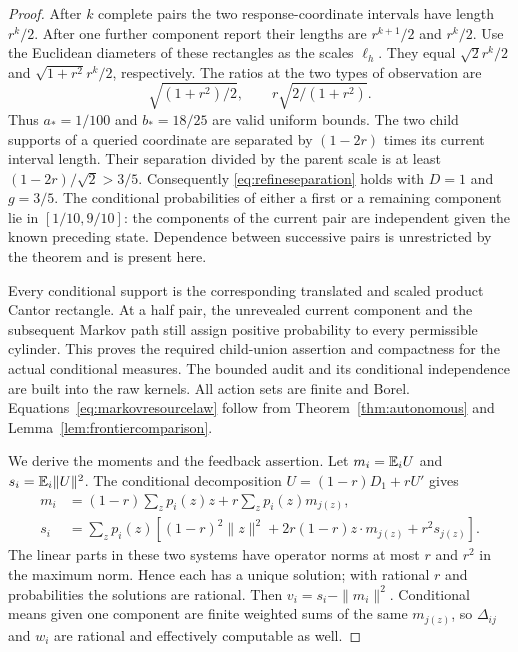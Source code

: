 \begin{proof}
After $k$ complete pairs the two response-coordinate intervals have length $r^k/2$. After one further component report their lengths are $r^{k+1}/2$ and $r^k/2$. Use the Euclidean diameters of these rectangles as the scales $\ell_h$. They equal $\sqrt2r^k/2$ and $\sqrt{1+r^2}r^k/2$, respectively. The ratios at the two types of observation are
\[
 \sqrt{(1+r^2)/2},\qquad r\sqrt{2/(1+r^2)}.
\]
Thus $a_*=1/100$ and $b_*=18/25$ are valid uniform bounds. The two child supports of a queried coordinate are separated by $(1-2r)$ times its current interval length. Their separation divided by the parent scale is at least $(1-2r)/\sqrt2>3/5$. Consequently \eqref{eq:refineseparation} holds with $D=1$ and $g=3/5$. The conditional probabilities of either a first or a remaining component lie in $[1/10,9/10]$: the components of the current pair are independent given the known preceding state. Dependence between successive pairs is unrestricted by the theorem and is present here.

Every conditional support is the corresponding translated and scaled product Cantor rectangle. At a half pair, the unrevealed current component and the subsequent Markov path still assign positive probability to every permissible cylinder. This proves the required child-union assertion and compactness for the actual conditional measures. The bounded audit and its conditional independence are built into the raw kernels. All action sets are finite and Borel. Equations~\eqref{eq:markovresourcelaw} follow from Theorem~\ref{thm:autonomous} and Lemma~\ref{lem:frontiercomparison}.

We derive the moments and the feedback assertion. Let $m_i=\mathbb E_iU$ and $s_i=\mathbb E_i\|U\|^2$. The conditional decomposition $U=(1-r)D_1+rU'$ gives
\begin{align}
 m_i&=(1-r)\sum_zp_i(z)z+r\sum_zp_i(z)m_{j(z)},\label{eq:markovmeans}\\
 s_i&=\sum_zp_i(z)\left[(1-r)^2\|z\|^2+
          2r(1-r)z\cdot m_{j(z)}+r^2s_{j(z)}\right].\label{eq:markovseconds}
\end{align}
The linear parts in these two systems have operator norms at most $r$ and $r^2$ in the maximum norm. Hence each has a unique solution; with rational $r$ and probabilities the solutions are rational. Then $v_i=s_i-\|m_i\|^2$. Conditional means given one component are finite weighted sums of the same $m_{j(z)}$, so $\Delta_{ij}$ and $w_i$ are rational and effectively computable as well.


\end{proof}

